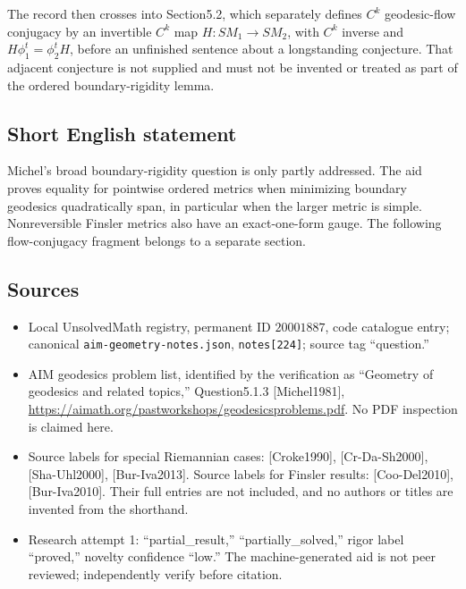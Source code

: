 \documentclass[11pt]{article}
\begin{document}
The record then crosses into Section5.2, which separately defines \(C^k\) geodesic-flow conjugacy by an invertible \(C^k\) map \(H:SM_1\to SM_2\), with \(C^k\) inverse and \(H\phi_1^t=\phi_2^tH\), before an unfinished sentence about a longstanding conjecture. That adjacent conjecture is not supplied and must not be invented or treated as part of the ordered boundary-rigidity lemma.
\subsection{Short English statement}
Michel's broad boundary-rigidity question is only partly addressed. The aid proves equality for pointwise ordered metrics when minimizing boundary geodesics quadratically span, in particular when the larger metric is simple. Nonreversible Finsler metrics also have an exact-one-form gauge. The following flow-conjugacy fragment belongs to a separate section.
\subsection{Sources}
\begin{itemize}
\item Local UnsolvedMath registry, permanent ID \(20001887\), code catalogue entry; canonical \texttt{aim-geometry-notes.json}, \texttt{notes[224]}; source tag ``question.''
\item AIM geodesics problem list, identified by the verification as ``Geometry of geodesics and related topics,'' Question5.1.3 [Michel1981], \url{https://aimath.org/pastworkshops/geodesicsproblems.pdf}. No PDF inspection is claimed here.
\item Source labels for special Riemannian cases: [Croke1990], [Cr-Da-Sh2000], [Sha-Uhl2000], [Bur-Iva2013]. Source labels for Finsler results: [Coo-Del2010], [Bur-Iva2010]. Their full entries are not included, and no authors or titles are invented from the shorthand.
\item Research attempt 1: ``partial\_result,'' ``partially\_solved,'' rigor label ``proved,'' novelty confidence ``low.'' The machine-generated aid is not peer reviewed; independently verify before citation.
\end{itemize}
\end{document}
